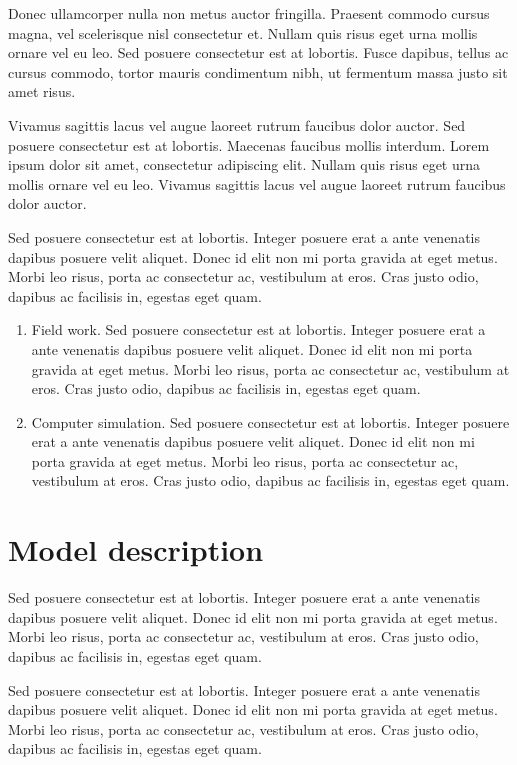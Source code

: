 \documentclass[journal]{../template/IEEEtran}
\begin{document}
Donec ullamcorper nulla non metus auctor fringilla. Praesent commodo cursus magna, vel scelerisque nisl consectetur et. Nullam quis risus eget urna mollis ornare vel eu leo. Sed posuere consectetur est at lobortis. Fusce dapibus, tellus ac cursus commodo, tortor mauris condimentum nibh, ut fermentum massa justo sit amet risus.

Vivamus sagittis lacus vel augue laoreet rutrum faucibus dolor auctor. Sed posuere consectetur est at lobortis. Maecenas faucibus mollis interdum. Lorem ipsum dolor sit amet, consectetur adipiscing elit. Nullam quis risus eget urna mollis ornare vel eu leo. Vivamus sagittis lacus vel augue laoreet rutrum faucibus dolor auctor.

Sed posuere consectetur est at lobortis. Integer posuere erat a ante venenatis dapibus posuere velit aliquet. Donec id elit non mi porta gravida at eget metus. Morbi leo risus, porta ac consectetur ac, vestibulum at eros. Cras justo odio, dapibus ac facilisis in, egestas eget quam.

\begin{enumerate}
	\item{Field work.} Sed posuere consectetur est at lobortis. Integer posuere erat a ante venenatis dapibus posuere velit aliquet. Donec id elit non mi porta gravida at eget metus. Morbi leo risus, porta ac consectetur ac, vestibulum at eros. Cras justo odio, dapibus ac facilisis in, egestas eget quam.
	\item{Computer simulation.} Sed posuere consectetur est at lobortis. Integer posuere erat a ante venenatis dapibus posuere velit aliquet. Donec id elit non mi porta gravida at eget metus. Morbi leo risus, porta ac consectetur ac, vestibulum at eros. Cras justo odio, dapibus ac facilisis in, egestas eget quam.
\end{enumerate}

\section{Model description}

Sed posuere consectetur est at lobortis. Integer posuere erat a ante venenatis dapibus posuere velit aliquet. Donec id elit non mi porta gravida at eget metus. Morbi leo risus, porta ac consectetur ac, vestibulum at eros. Cras justo odio, dapibus ac facilisis in, egestas eget quam.

Sed posuere consectetur est at lobortis. Integer posuere erat a ante venenatis dapibus posuere velit aliquet. Donec id elit non mi porta gravida at eget metus. Morbi leo risus, porta ac consectetur ac, vestibulum at eros. Cras justo odio, dapibus ac facilisis in, egestas eget quam.
\end{document}
